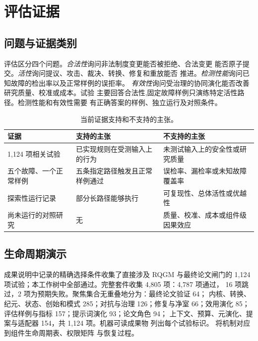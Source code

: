 \section{评估证据}\label{chapter:eval}

\subsection{问题与证据类别}\label{sec:eval:sample}

评估区分四个问题。\emph{合法性}询问非法制度变更能否被拒绝、合法变更
能否原子提交。\emph{活性}询问提议、攻击、裁决、转换、修复和重放能否
推进。\emph{检测性能}询问已知故障的检出率以及正常样例的误拒率。
\emph{有效性}询问受治理的协同演化能否改善研究质量、校准或成本。试验
主要回答合法性,固定故障样例只演练特定活性路径。检测性能和有效性需要
有正确答案的样例、独立运行及对照条件。

\begin{table}[t]
  \centering
  \small
  \begin{tabularx}{\columnwidth}{@{}lXX@{}}
    \toprule
    \textbf{证据} & \textbf{支持的主张} & \textbf{不支持的主张} \\
    \midrule
    1,124 项相关试验 & 已实现规则在受测输入上的行为 &
      未测试输入上的安全性或研究质量 \\
    五个故障、一个正常样例 & 五条指定路径触发且正常样例通过 &
      误检率、漏检率或未知故障覆盖率 \\
    探索性运行记录 & 部分长路径能够执行 &
      可复现性、总体活性或优越性 \\
    尚未运行的对照研究 & 无 &
      质量、校准、成本或组件级因果效应 \\
    \bottomrule
  \end{tabularx}
  \caption{当前证据支持和不支持的主张。}
  \label{tab:eval-status}
\end{table}

\subsection{生命周期演示}\label{sec:eval:construction}

成果说明中记录的精确选择条件收集了直接涉及 RQGM 与最终论文闸门的
1,124 项试验；本工作树中全部通过。完整套件收集 4,805 项：4,787 项通过，
16 项跳过，2 项为预期失败。聚焦集合无重叠地分为：最终论文验证 64；
内核、转换、纪元、状态、创始和模式 285；对抗与治理 126；修复与净室
66；效用演化 85；评估样例与指标 157；提示词演化 93；论文角色 94；
上下文、预算、元演化、提案与适配器 154，共 1,124 项。机器可读成果物
列出每个试验标识。
 将机制对应到组件生命周期表、权限矩阵
与恢复过程。

